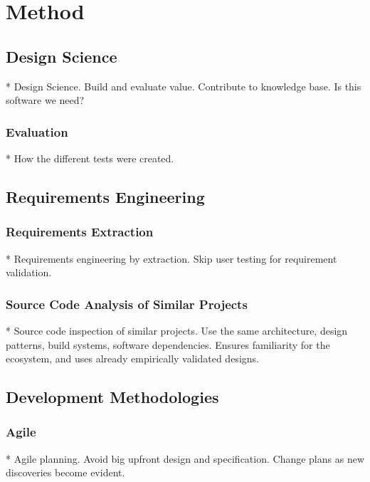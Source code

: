 \chapter{Method}\label{chap:method}



\section{Design Science}

* Design Science. Build and evaluate value. Contribute to knowledge base. Is this software we need?

\subsection{Evaluation}

* How the different tests were created.

\section{Requirements Engineering}

\subsection{Requirements Extraction}

* Requirements engineering by extraction. Skip user testing for requirement validation. 

\subsection{Source Code Analysis of Similar Projects}
* Source code inspection of similar projects. Use the same architecture, design patterns, build systems, software dependencies. Ensures familiarity for the ecosystem, and uses already empirically validated designs.

\section{Development Methodologies}

\subsection{Agile}

* Agile planning. Avoid big upfront design and specification. Change plans as new discoveries become evident.

